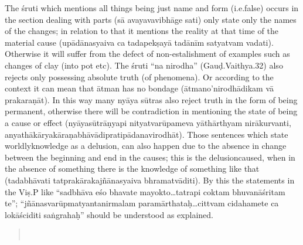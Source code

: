 The śruti which mentions all things being just name and form (i.e.false) occurs in the section dealing with parts (sā avayavavibhāge sati) only state only the names of the changes; in relation to that it mentions the reality at that time of the material cause (upādānasyaiva ca tadape\-kṣayā tadānīm satyatvam vadati). Otherwise it will suffer from the defect of non-estalishment of examples such as changes of clay (into pot etc). The śruti “na nirodha” (Gauḍ.Vaithya.32) also rejects only possessing absolute truth (of phenomena). Or according to the context it can mean that ātman has no bondage (ātmano’nirodhādikam vā prakaraṇāt). In this way many nyāya sūtras also reject truth in the form of being permanent, otherwise there will be contradiction in mentioning the state of being a cause or effect (nyāyasūtrāṇyapi nityatvarūpameva yāthārthyam nirākurvanti, anyathākāryakāraṇabhāvādipratipādanavirodhāt). Those sentences which state worldly\break knowledge as a delusion, can also happen due to the absence in change between the beginning and end in the causes; this is the delusion\break caused, when in the absence of something there is the knowledge of something like that (tadabhāvati tatprakārakajñānasyaiva bhramatvā\-diti). By this the statements in the Viṣ.P like “sadbhāva eśo bhavate mayokto…tatrapi coktam bhuvanāśritam te”;  “jñānasvarūpmatyanta\-nirmalam paramārthataḥ…cittvam cidahamete ca lokāściditi saṅgrahaḥ” should be understood as explained.

\begin{verse}
\\
\end{verse}

